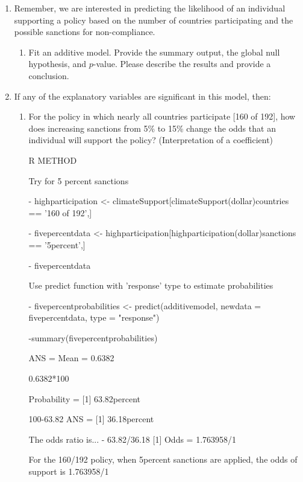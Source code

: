 \documentclass[12pt,letterpaper]{article}
\begin{document}
\begin{enumerate}
	\item
	Remember, we are interested in predicting the likelihood of an individual supporting a policy based on the number of countries participating and the possible sanctions for non-compliance.
	\begin{enumerate}
		\item [] Fit an additive model. Provide the summary output, the global null hypothesis, and $p$-value. Please describe the results and provide a conclusion.
	\end{enumerate}
	
	\item
	If any of the explanatory variables are significant in this model, then:
	\begin{enumerate}
		\item
		For the policy in which nearly all countries participate [160 of 192], how does increasing sanctions from 5\% to 15\% change the odds that an individual will support the policy? (Interpretation of a coefficient)
		\vspace{1cm}
		
		R METHOD
		
				\vspace{0.5cm}

Try for 5 percent sanctions
	
		- highparticipation <-  climateSupport[climateSupport(dollar)countries == '160 of 192',]
		
		- fivepercentdata <- highparticipation[highparticipation(dollar)sanctions == '5percent',]
	
		- fivepercentdata

Use predict function with 'response' type to estimate probabilities
		
		- fivepercentprobabilities <- predict(additivemodel, newdata = fivepercentdata, type = "response")
		
		-summary(fivepercentprobabilities) 
	
		ANS = Mean = 0.6382 
		
		0.6382*100 
		
Probability = [1] 63.82percent
		
		100-63.82 
		ANS = [1] 36.18percent

The odds ratio is...
		- 63.82/36.18 
[1] Odds = 1.763958/1 

 For the 160/192 policy, when 5percent sanctions are applied, the odds of support is 1.763958/1
		

\end{enumerate}
\end{enumerate}
\end{document}
